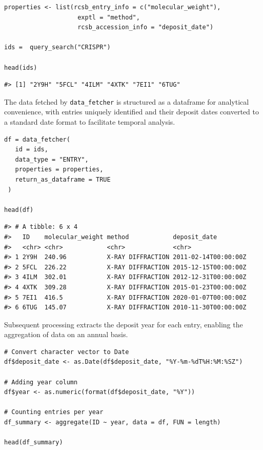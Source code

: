 \begin{verbatim}
properties <- list(rcsb_entry_info = c("molecular_weight"),
                    exptl = "method",
                    rcsb_accession_info = "deposit_date")

ids =  query_search("CRISPR")

head(ids)
\end{verbatim}

\begin{verbatim}
#> [1] "2Y9H" "5FCL" "4ILM" "4XTK" "7EI1" "6TUG"
\end{verbatim}

The data fetched by \texttt{data\_fetcher} is structured as a dataframe for analytical convenience, with entries uniquely identified and their deposit dates converted to a standard date format to facilitate temporal analysis.

\begin{verbatim}
df = data_fetcher(
   id = ids,
   data_type = "ENTRY",
   properties = properties,
   return_as_dataframe = TRUE
 )

head(df)
\end{verbatim}

\begin{verbatim}
#> # A tibble: 6 x 4
#>   ID    molecular_weight method            deposit_date        
#>   <chr> <chr>            <chr>             <chr>               
#> 1 2Y9H  240.96           X-RAY DIFFRACTION 2011-02-14T00:00:00Z
#> 2 5FCL  226.22           X-RAY DIFFRACTION 2015-12-15T00:00:00Z
#> 3 4ILM  302.01           X-RAY DIFFRACTION 2012-12-31T00:00:00Z
#> 4 4XTK  309.28           X-RAY DIFFRACTION 2015-01-23T00:00:00Z
#> 5 7EI1  416.5            X-RAY DIFFRACTION 2020-01-07T00:00:00Z
#> 6 6TUG  145.07           X-RAY DIFFRACTION 2010-11-30T00:00:00Z
\end{verbatim}

Subsequent processing extracts the deposit year for each entry, enabling the aggregation of data on an annual basis.

\begin{verbatim}
# Convert character vector to Date
df$deposit_date <- as.Date(df$deposit_date, "%Y-%m-%dT%H:%M:%SZ")

# Adding year column
df$year <- as.numeric(format(df$deposit_date, "%Y"))

# Counting entries per year
df_summary <- aggregate(ID ~ year, data = df, FUN = length)

head(df_summary)
\end{verbatim}

